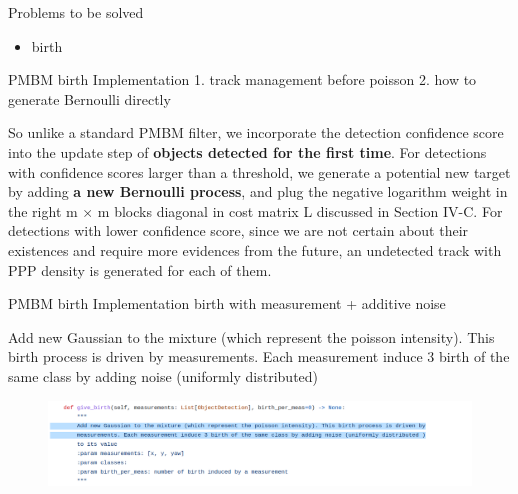 \documentclass[aspectratio=169,xcolor=dvipsnames]{beamer}
\begin{document}
\begin{frame}{Problems to be solved}
    \begin{itemize}
        \item{birth}
    \end{itemize}
\end{frame}

\begin{frame}{PMBM birth Implementation}
    1. track management before poisson
    2. how to generate Bernoulli directly
    \begin{block}{}
    So unlike a standard PMBM filter, we incorporate the detection confidence score into the update step 
    of \textbf{objects detected for the first time}. 
    For detections with confidence scores larger than a threshold, 
    we generate a potential new target by adding \textbf{a new Bernoulli process}, 
    and plug the negative logarithm weight in the right m × m blocks diagonal in cost matrix L 
    discussed in Section IV-C. For detections with lower confidence score, 
    since we are not certain about their existences and require more evidences from the future, 
    an undetected track with PPP density is generated for each of them.
    \href{https://www.researchgate.net/publication/355428771_3D_Multi-Object_Tracking_using_Random_Finite_Set-based_Multiple_Measurement_Models_Filtering_RFS-M_3_for_Autonomous_Vehicles}{}
    \end{block}
\end{frame}

\begin{frame}{PMBM birth Implementation}
    birth with measurement + additive noise
    \begin{block}{}
    Add new Gaussian to the mixture (which represent the poisson intensity). This birth process is driven by
    measurements. Each measurement induce 3 birth of the same class by adding noise (uniformly distributed)
    \href{https://github.com/quan-dao/pmbm-filter/blob/5cdf8b31665f1a7008afa963c1ab7c3b048b5856/poisson.py}{}
    \end{block}
    \begin{figure}
        \includegraphics[width=0.9\linewidth]{pmbm/1.png}
    \end{figure}
\end{frame}
\end{document}
